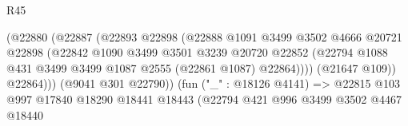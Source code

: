 \begin{lexlean}{R45}
\begin{coremodule}
                                              (@22880
                                                (@22887
                                                  (@22893
                                                    @22898
                                                    (@22888
                                                      @1091
                                                      @3499
                                                      @3502
                                                      @4666
                                                      @20721
                                                      @22898
                                                      (@22842
                                                        @1090
                                                        @3499
                                                        @3501
                                                        @3239
                                                        @20720
                                                        @22852
                                                        (@22794
                                                          @1088
                                                          @431
                                                          @3499
                                                          @3499
                                                          @1087
                                                          @2555
                                                          (@22861 @1087)
                                                          @22864))))
                                                  (@21647 @109))
                                                @22864)))
                                          (@9041 @301 @22790))
                                        (fun ("_" : @18126 @4141) =>
                                        @22815
                                          @103
                                          @997
                                          @17840
                                          @18290
                                          @18441
                                          @18443
                                          (@22794
                                            @421
                                            @996
                                            @3499
                                            @3502
                                            @4467
                                            @18440

\end{coremodule}
\end{lexlean}
